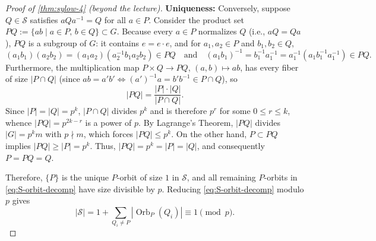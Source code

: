 \begin{content}
\begin{proof}[Proof of \cref{thm:sylow-4} (beyond the lecture)]
\textbf{Uniqueness:} Conversely, suppose $Q \in \mathcal{S}$ satisfies $a Q a^{-1} = Q$ for all $a \in P$. Consider the product set $P Q := \{ a b \mid a \in P, \, b \in Q \} \subset G$. Because every $a \in P$ normalizes $Q$ (i.e., $a Q = Q a$), $P Q$ is a subgroup of $G$: it contains $e = e \cdot e$, and for $a_1, a_2 \in P$ and $b_1, b_2 \in Q$,
\[
(a_1 b_1)(a_2 b_2) = (a_1 a_2)(a_2^{-1} b_1 a_2 b_2) \in P Q \quad \text{and} \quad (a_1 b_1)^{-1} = b_1^{-1} a_1^{-1} = a_1^{-1} (a_1 b_1^{-1} a_1^{-1}) \in P Q.
\]
Furthermore, the multiplication map $P \times Q \to P Q$, $(a, b) \mapsto ab$, has every fiber of size $|P \cap Q|$ (since $a b = a' b' \iff (a')^{-1} a = b' b^{-1} \in P \cap Q$), so
\[
|P Q| = \frac{|P| \cdot |Q|}{|P \cap Q|}.
\]
Since $|P| = |Q| = p^k$, $|P \cap Q|$ divides $p^k$ and is therefore $p^r$ for some $0 \le r \le k$, whence $|P Q| = p^{2k - r}$ is a power of $p$. By Lagrange's Theorem, $|P Q|$ divides $|G| = p^k m$ with $p \nmid m$, which forces $|P Q| \le p^k$. On the other hand, $P \subset P Q$ implies $|P Q| \ge |P| = p^k$. Thus, $|P Q| = p^k = |P| = |Q|$, and consequently $P = P Q = Q$.

Therefore, $\{P\}$ is the unique $P$-orbit of size $1$ in $\mathcal{S}$, and all remaining $P$-orbits in \eqref{eq:S-orbit-decomp} have size divisible by $p$. Reducing \eqref{eq:S-orbit-decomp} modulo $p$ gives
\[
|\mathcal{S}| = 1 + \sum_{Q_i \neq P} |\operatorname{Orb}_P(Q_i)| \equiv 1 \pmod p.
\]
\end{proof}
\end{content}

